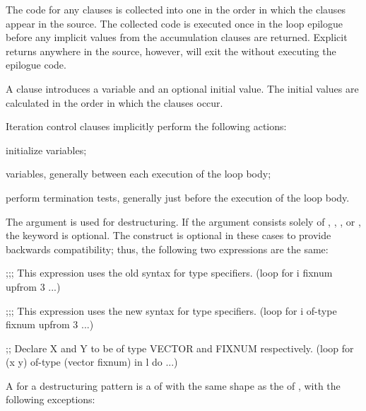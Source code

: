 \itemitem{\bull}    The code for any  clauses is collected 
  into one  in the order in which the clauses appear in
  the source.  The collected code is executed once in the loop epilogue
  before any implicit values from the accumulation clauses are returned.
  Explicit returns anywhere in the source, however, will exit the 
   without executing the epilogue code.
                     
\itemitem{\bull}  A  clause introduces a variable 
  and an optional initial value.  The initial values are calculated 
  in the order in which the  clauses occur.
 
\itemitem{\bull}  
  Iteration control clauses implicitly perform the following actions:
 
\beginlist
\itemitem{--}  initialize variables;
 
\itemitem{--}   variables, generally 
between each execution of the loop body;
 
\itemitem{--} perform termination tests, 
generally just before the execution of the
  loop body.
 
  \endlist
  \endlist
 
\endsubsubsection%


The  argument is used for destructuring.
If the
 argument consists solely of ,
, , or \nil, the  keyword is optional.
The  construct is optional in these cases to provide backwards
compatibility; thus, the following two expressions are the same:

\code
;;; This expression uses the old syntax for type specifiers.
 (loop for i fixnum upfrom 3 ...)
 
;;; This expression uses the new syntax for type specifiers.
 (loop for i of-type fixnum upfrom 3 ...)

;; Declare X and Y to be of type VECTOR and FIXNUM respectively.
 (loop for (x y) of-type (vector fixnum) 
       in l do ...)
\endcode
 
A  for a destructuring pattern is a  of 
 with the same shape as the  of
 , with the following exceptions:
 
